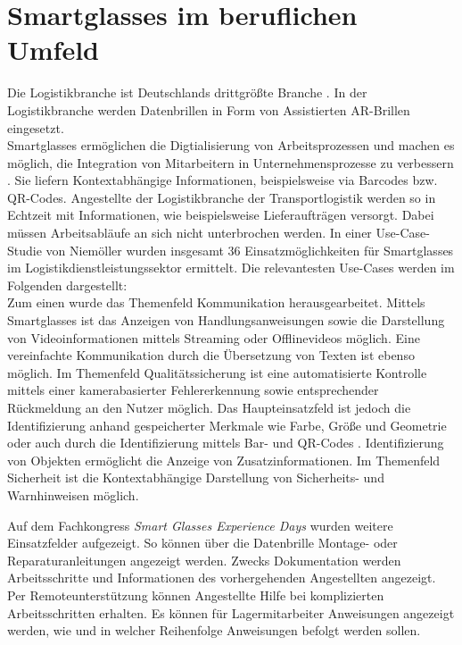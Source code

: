 \section{Smartglasses im beruflichen Umfeld}
\label{sec:Smartglasses_im beruflichen_Umfeld}
Die Logistikbranche ist Deutschlands drittgrößte Branche \cite{Zobel2016}. In der Logistikbranche werden Datenbrillen in Form von Assistierten AR-Brillen eingesetzt. 
\\
Smartglasses ermöglichen die Digtialisierung von Arbeitsprozessen und machen es möglich, die Integration von Mitarbeitern in Unternehmensprozesse zu verbessern \cite{Zobel2016}. Sie liefern Kontextabhängige Informationen, beispielsweise via Barcodes bzw. QR-Codes. Angestellte der Logistikbranche der Transportlogistik werden so in Echtzeit mit Informationen, wie beispielsweise Lieferaufträgen versorgt. Dabei müssen Arbeitsabläufe an sich nicht unterbrochen werden. In einer Use-Case-Studie von Niemöller \cite{Niemoller2017} wurden insgesamt 36 Einsatzmöglichkeiten für Smartglasses im Logistikdienstleistungssektor ermittelt. Die relevantesten Use-Cases werden im Folgenden dargestellt:
\\
Zum einen wurde das Themenfeld Kommunikation herausgearbeitet. Mittels Smartglasses ist das Anzeigen von Handlungsanweisungen sowie die Darstellung von Videoinformationen mittels Streaming oder Offlinevideos möglich. Eine vereinfachte Kommunikation durch die Übersetzung von Texten ist ebenso möglich. Im Themenfeld Qualitätssicherung ist eine automatisierte Kontrolle mittels einer kamerabasierter Fehlererkennung sowie entsprechender Rückmeldung an den Nutzer möglich. Das Haupteinsatzfeld ist jedoch die Identifizierung anhand gespeicherter Merkmale wie Farbe, Größe und Geometrie oder auch durch die Identifizierung mittels Bar- und QR-Codes \cite{Niemoller2017}. Identifizierung von Objekten ermöglicht die Anzeige von Zusatzinformationen. Im Themenfeld Sicherheit ist die Kontextabhängige Darstellung von Sicherheits- und Warnhinweisen möglich. 

Auf dem Fachkongress \emph{Smart Glasses Experience Days} \cite{Manokaran-Pathamathan2017} wurden weitere Einsatzfelder aufgezeigt. So können über die Datenbrille Montage- oder Reparaturanleitungen angezeigt werden. Zwecks Dokumentation werden Arbeitsschritte und Informationen des vorhergehenden Angestellten angezeigt. Per Remoteunterstützung können Angestellte Hilfe bei komplizierten Arbeitsschritten erhalten. Es können für Lagermitarbeiter Anweisungen angezeigt werden, wie und in welcher Reihenfolge Anweisungen befolgt werden sollen.

